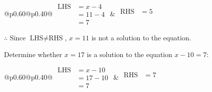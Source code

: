 \documentclass[12pt]{article}
\newcounter{minipagecount}
\begin{document}
\begin{multicols}{2}
\begin{minipage}[t]{0.40\textwidth}
    \noindent
    \renewcommand{\arraystretch}{1.3} %
    \begin{tabular}{@{}p{0.60\linewidth}@{}p{0.40\linewidth}@{}}
        \(\begin{aligned}
            \text{LHS} &= x - 4 \\
                    &= 11 - 4 \\
                    &= 7
        \end{aligned}\) &
        \(\begin{aligned}
            \text{RHS} &= 5\\
                    & \\
                    &
        \end{aligned}\)
    \end{tabular}
    \renewcommand{\arraystretch}{1.0} %
    \vspace{2pt}  %

    \noindent \(\therefore\) Since \(\text{LHS} \neq \text{RHS}\), \(x = 11\) is not  a solution to the equation.

\end{minipage}

 \vspace*{16pt}
\noindent{(\theminipagecount)}\hspace{0.1mm} %
\begin{minipage}[t]{0.40\textwidth} %

    \noindent Determine whether \(x = 17\) is a solution to the equation \(x - 10 = 7\):
    \vspace{4pt}  %

    \noindent
    \renewcommand{\arraystretch}{1.3} %
    \begin{tabular}{@{}p{0.60\linewidth}@{}p{0.40\linewidth}@{}}
        \(\begin{aligned}
            \text{LHS} &= x - 10 \\
                    &= 17 - 10 \\
                    &= 7
        \end{aligned}\) &
        \(\begin{aligned}
            \text{RHS} &= 7\\
                    & \\
                    &
        \end{aligned}\)
    \end{tabular}
    \renewcommand{\arraystretch}{1.0} %
    \vspace{2pt}  %


\end{minipage}
\end{multicols}
\end{document}
